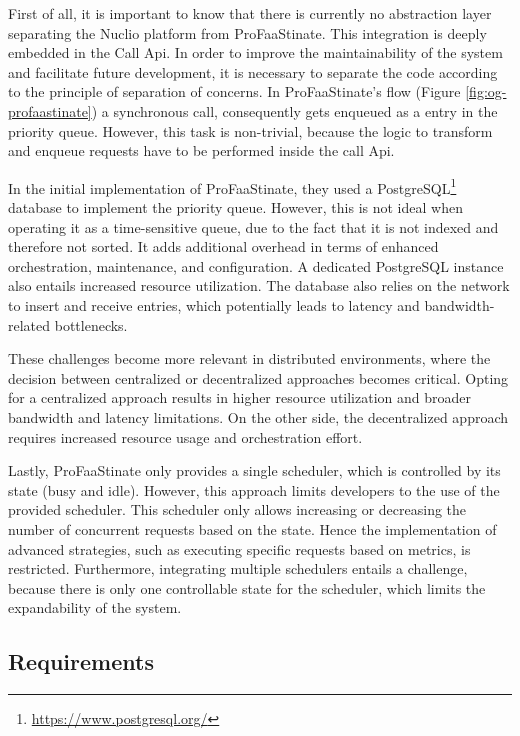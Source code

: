 First of all, it is important to know that there is currently no abstraction layer separating the Nuclio platform from ProFaaStinate. This integration is deeply embedded in the Call Api. In order to improve the maintainability of the system and facilitate future development, it is necessary to separate the code according to the principle of separation of concerns. In ProFaaStinate's flow (Figure \ref{fig:og-profaastinate}) a synchronous call, consequently gets enqueued as a entry in the priority queue. However, this task is non-trivial, because the logic to transform and enqueue requests have to be performed inside the call Api. 

In the initial implementation of ProFaaStinate, they used a PostgreSQL\footnote{\url{https://www.postgresql.org/}} database to implement the priority queue. However, this is not ideal when operating it as a time-sensitive queue, due to the fact that it is not indexed and therefore not sorted. It adds additional overhead in terms of enhanced orchestration, maintenance, and configuration. A dedicated PostgreSQL instance also entails increased resource utilization. The database also relies on the network to insert and receive entries, which potentially leads to latency and bandwidth-related bottlenecks.

These challenges become more relevant in distributed environments, where the decision between centralized or decentralized approaches becomes critical. Opting for a centralized approach results in higher resource utilization and broader bandwidth and latency limitations. On the other side, the decentralized approach requires increased resource usage and orchestration effort.

Lastly, ProFaaStinate only provides a single scheduler, which is controlled by its state (busy and idle). However, this approach limits developers to the use of the provided scheduler. This scheduler only allows increasing or decreasing the number of concurrent requests based on the state. Hence the implementation of advanced strategies, such as executing specific requests based on metrics, is restricted. Furthermore, integrating multiple schedulers entails a challenge, because there is only one controllable state for the scheduler, which limits the expandability of the system. \cite{schirmer2023profaastinate}

\subsection{Requirements}
\label{sec:requirements}

